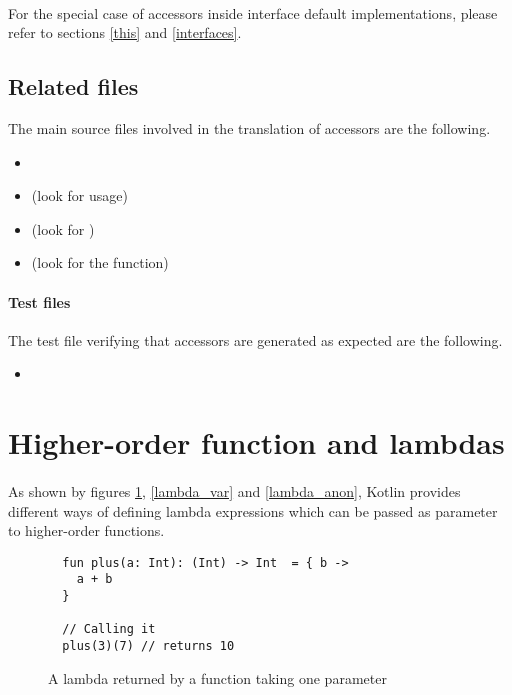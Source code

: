 \paragraph{} For the special case of accessors inside interface default implementations, please 
refer to sections \ref{this} and \ref{interfaces}.


\subsection{Related files} The main source files involved in the translation of accessors are 
the following.

\begin{itemize}
 \item {}
 \item {} (look for  usage)
 \item {} (look for )
 \item {} (look for the  function)
\end{itemize}

\paragraph{Test files} The test file verifying that accessors are generated as 
expected are the following.

\begin{itemize}
 \item {}
\end{itemize}

\section{Higher-order function and lambdas} \label{lambda_expr}

\paragraph{} As shown by figures \ref{lambda_fun}, \ref{lambda_var} and \ref{lambda_anon}, Kotlin 
provides different ways of defining lambda expressions which can be passed as 
parameter to higher-order functions.


\begin{figure}[h]
  \begin{verbatim}
  fun plus(a: Int): (Int) -> Int  = { b ->
    a + b
  }
  
  // Calling it
  plus(3)(7) // returns 10
  \end{verbatim}
  \caption{A lambda  returned by a function taking one  
parameter}
  \label{lambda_fun}
\end{figure}


